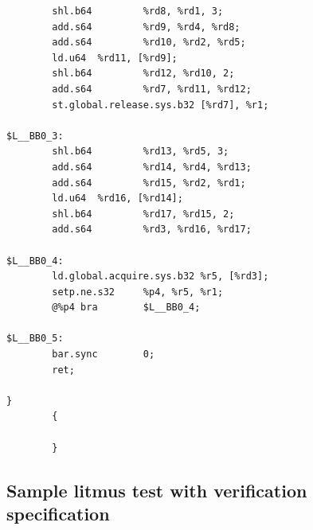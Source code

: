 \documentclass[acmsmall]{acmart}
\begin{document}
\begin{lstlisting}
        shl.b64         %rd8, %rd1, 3;
        add.s64         %rd9, %rd4, %rd8;
        add.s64         %rd10, %rd2, %rd5;
        ld.u64  %rd11, [%rd9];
        shl.b64         %rd12, %rd10, 2;
        add.s64         %rd7, %rd11, %rd12;
        st.global.release.sys.b32 [%rd7], %r1;

$L__BB0_3:
        shl.b64         %rd13, %rd5, 3;
        add.s64         %rd14, %rd4, %rd13;
        add.s64         %rd15, %rd2, %rd1;
        ld.u64  %rd16, [%rd14];
        shl.b64         %rd17, %rd15, 2;
        add.s64         %rd3, %rd16, %rd17;

$L__BB0_4:
        ld.global.acquire.sys.b32 %r5, [%rd3];
        setp.ne.s32     %p4, %r5, %r1;
        @%p4 bra        $L__BB0_4;

$L__BB0_5:
        bar.sync        0;
        ret;

}
        {

        }
\end{lstlisting}



\subsection{Sample litmus test with verification specification}

\end{document}
